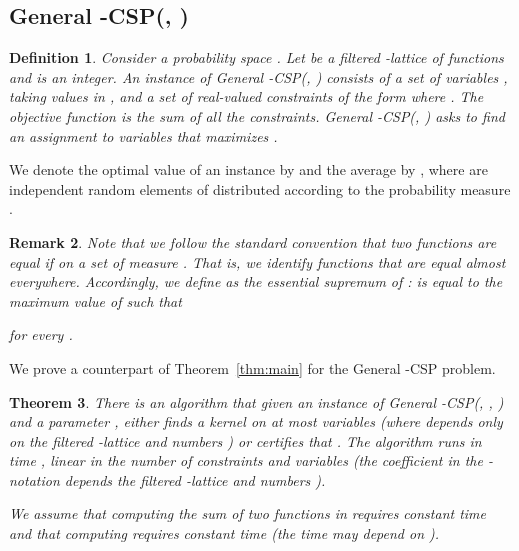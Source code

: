 \documentclass[11pt]{article}
\newtheorem{theorem}{Theorem}
\newtheorem{definition}[theorem]{Definition}
\newtheorem{remark}[theorem]{Remark}
\begin{document}
\subsection{General -CSP(, )}
\begin{definition}
Consider a probability space . Let  be a filtered -lattice of functions and  is an integer.
An instance  of General -CSP(,  ) consists of a set of variables , taking values in ,
and a set of real-valued constraints of the form   where . The objective function  is the sum of
all the constraints.
General -CSP(, ) asks to find an assignment to variables  that maximizes
.
\end{definition}
We denote the optimal value of an instance  by  and the average
by , where  are independent random elements of  distributed according to the probability measure .
\begin{remark}\label{rem:measure-0}
Note that we follow the standard convention that two functions  are equal if  on a set of measure .
That is, we identify functions that are equal almost everywhere. Accordingly, we define  as the essential supremum  of :
  is equal to the maximum value of  such that

for every .
\end{remark}
We prove a counterpart of Theorem~\ref{thm:main} for the General -CSP problem.

\begin{theorem}\label{thm:main-A-CSP}
There is an algorithm that given an instance of General -CSP(, , ) and a parameter ,
either finds a kernel on at most  variables (where  depends only on the filtered -lattice  and numbers )
or
certifies that .
The algorithm runs in time , linear in the number of constraints  and variables  (the coefficient in the -notation depends the filtered -lattice  and numbers ).

 We assume that computing the sum of two functions in   requires constant time and that computing  requires constant time
(the time may depend on ).
\end{theorem}
\end{document}

